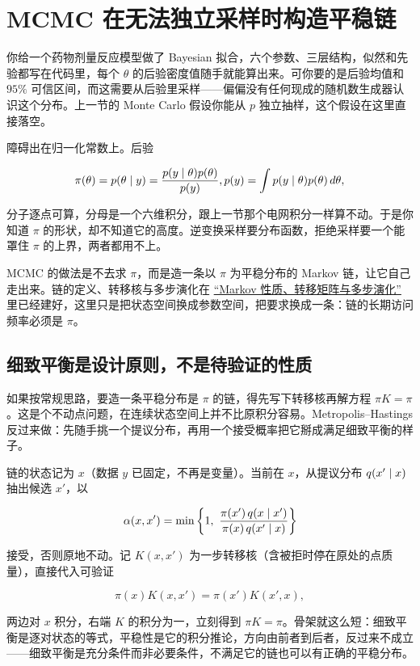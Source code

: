 \section{MCMC 在无法独立采样时构造平稳链}
\label{sec:13-Machine-Learning/08-Sampling-and-Inference/02}

你给一个药物剂量反应模型做了 Bayesian 拟合，六个参数、三层结构，似然和先验都写在代码里，每个 \(\theta\) 的后验密度值随手就能算出来。可你要的是后验均值和 \(95\%\) 可信区间，而这需要从后验里采样——偏偏没有任何现成的随机数生成器认识这个分布。上一节的 Monte Carlo 假设你能从 \(p\) 独立抽样，这个假设在这里直接落空。

障碍出在归一化常数上。后验

\[
\pi(\theta)=p(\theta\mid y)
=\frac{p(y\mid\theta)p(\theta)}{p(y)},
\space
p(y)=\int p(y\mid\theta)p(\theta)\,d\theta,
\]

分子逐点可算，分母是一个六维积分，跟上一节那个电网积分一样算不动。于是你知道 \(\pi\) 的形状，却不知道它的高度。逆变换采样要分布函数，拒绝采样要一个能罩住 \(\pi\) 的上界，两者都用不上。

MCMC 的做法是不去求 \(\pi\)，而是造一条以 \(\pi\) 为平稳分布的 Markov 链，让它自己走出来。链的定义、转移核与多步演化在 \hyperref[sec:06-Random-Processes/03-Markov-Chains/01]{``Markov 性质、转移矩阵与多步演化''} 里已经建好，这里只是把状态空间换成参数空间，把要求换成一条：链的长期访问频率必须是 \(\pi\)。

\subsection{细致平衡是设计原则，不是待验证的性质}

如果按常规思路，要造一条平稳分布是 \(\pi\) 的链，得先写下转移核再解方程 \(\pi K=\pi\)。这是个不动点问题，在连续状态空间上并不比原积分容易。Metropolis--Hastings 反过来做：先随手挑一个提议分布，再用一个接受概率把它掰成满足细致平衡的样子。

链的状态记为 \(x\)（数据 \(y\) 已固定，不再是变量）。当前在 \(x\)，从提议分布 \(q(x'\mid x)\) 抽出候选 \(x'\)，以

\[
\alpha(x,x')
=\min\left\{1,\ \frac{\pi(x')\,q(x\mid x')}{\pi(x)\,q(x'\mid x)}\right\}
\]

接受，否则原地不动。记 \(K(x,x')\) 为一步转移核（含被拒时停在原处的点质量），直接代入可验证

\[
\pi(x)K(x,x')=\pi(x')K(x',x),
\]

两边对 \(x\) 积分，右端 \(K\) 的积分为一，立刻得到 \(\pi K=\pi\)。骨架就这么短：细致平衡是逐对状态的等式，平稳性是它的积分推论，方向由前者到后者，反过来不成立——细致平衡是充分条件而非必要条件，不满足它的链也可以有正确的平稳分布。

